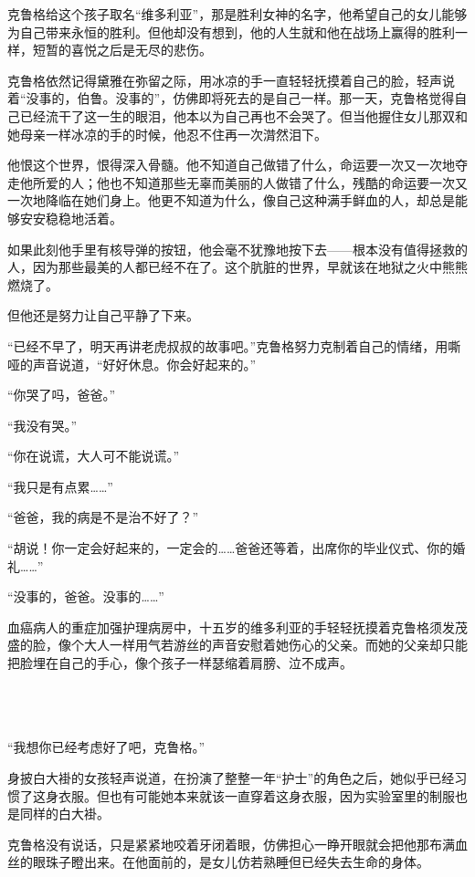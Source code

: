 克鲁格给这个孩子取名“维多利亚”，那是胜利女神的名字，他希望自己的女儿能够为自己带来永恒的胜利。但他却没有想到，他的人生就和他在战场上赢得的胜利一样，短暂的喜悦之后是无尽的悲伤。

克鲁格依然记得黛雅在弥留之际，用冰凉的手一直轻轻抚摸着自己的脸，轻声说着“没事的，伯鲁。没事的”，仿佛即将死去的是自己一样。那一天，克鲁格觉得自己已经流干了这一生的眼泪，他本以为自己再也不会哭了。但当他握住女儿那双和她母亲一样冰凉的手的时候，他忍不住再一次潸然泪下。

他恨这个世界，恨得深入骨髓。他不知道自己做错了什么，命运要一次又一次地夺走他所爱的人；他也不知道那些无辜而美丽的人做错了什么，残酷的命运要一次又一次地降临在她们身上。他更不知道为什么，像自己这种满手鲜血的人，却总是能够安安稳稳地活着。

如果此刻他手里有核导弹的按钮，他会毫不犹豫地按下去——根本没有值得拯救的人，因为那些最美的人都已经不在了。这个肮脏的世界，早就该在地狱之火中熊熊燃烧了。

但他还是努力让自己平静了下来。

“已经不早了，明天再讲老虎叔叔的故事吧。”克鲁格努力克制着自己的情绪，用嘶哑的声音说道，“好好休息。你会好起来的。”

“你哭了吗，爸爸。”

“我没有哭。”

“你在说谎，大人可不能说谎。”

“我只是有点累……”

“爸爸，我的病是不是治不好了？”

“胡说！你一定会好起来的，一定会的……爸爸还等着，出席你的毕业仪式、你的婚礼……”

“没事的，爸爸。没事的……”

血癌病人的重症加强护理病房中，十五岁的维多利亚的手轻轻抚摸着克鲁格须发茂盛的脸，像个大人一样用气若游丝的声音安慰着她伤心的父亲。而她的父亲却只能把脸埋在自己的手心，像个孩子一样瑟缩着肩膀、泣不成声。

 \section*{}

“我想你已经考虑好了吧，克鲁格。”

身披白大褂的女孩轻声说道，在扮演了整整一年“护士”的角色之后，她似乎已经习惯了这身衣服。但也有可能她本来就该一直穿着这身衣服，因为实验室里的制服也是同样的白大褂。

克鲁格没有说话，只是紧紧地咬着牙闭着眼，仿佛担心一睁开眼就会把他那布满血丝的眼珠子瞪出来。在他面前的，是女儿仿若熟睡但已经失去生命的身体。

